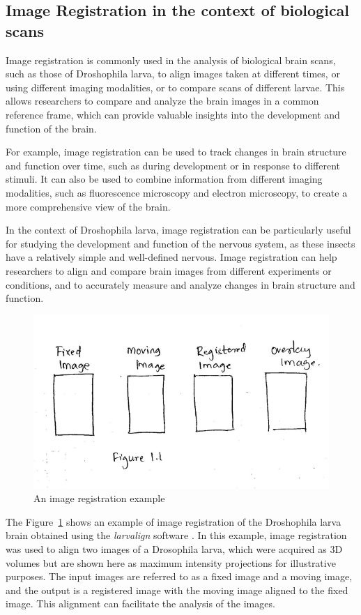 \documentclass{book}
\begin{document}
	\subsection{Image Registration in the context of biological scans}
	Image registration is commonly used in the analysis of biological brain scans, such as those of Droshophila larva, to align images taken at different times, or using different imaging modalities, or to compare scans of different larvae. This allows researchers to compare and analyze the brain images in a common reference frame, which can provide valuable insights into the development and function of the brain.
	
	For example, image registration can be used to track changes in brain structure and function over time, such as during development or in response to different stimuli. It can also be used to combine information from different imaging modalities, such as fluorescence microscopy and electron microscopy, to create a more comprehensive view of the brain.
	
	In the context of Droshophila larva, image registration can be particularly useful for studying the development and function of the nervous system, as these insects have a relatively simple and well-defined nervous. Image registration can help researchers to align and compare brain images from different experiments or conditions, and to accurately measure and analyze changes in brain structure and function.
	
	\begin{figure}[h!]
		\centering
		\includegraphics[width=0.7\columnwidth]{resources/chapter1/figure1.png}
		\caption{An image registration example}
		\label{fig:Registration}
	\end{figure}
	
	The Figure~\ref{fig:Registration} shows an example of image registration of the Droshophila larva brain obtained using the \textit{larvalign} software \cite{larvalign}. In this example, image registration was used to align two images of a Drosophila larva, which were acquired as 3D volumes but are shown here as maximum intensity projections for illustrative purposes. The input images are referred to as a fixed image and a moving image, and the output is a registered image with the moving image aligned to the fixed image. This alignment can facilitate the analysis of the images.
	
\end{document}

